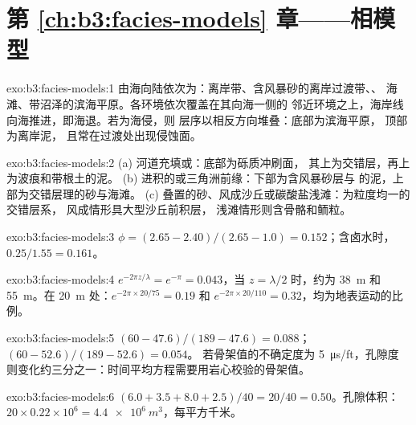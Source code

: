 \section*{第 \ref{ch:b3:facies-models} 章——相模型}

\begin{solution}{exo:b3:facies-models:1}
由海向陆依次为：离岸带、含风暴砂的离岸过渡带、、
海滩、带沼泽的滨海平原。各环境依次覆盖在其向海一侧的
邻近环境之上，海岸线向海推进，即海退。若为海侵，则
层序以相反方向堆叠：底部为滨海平原，
顶部为离岸泥，
且常在过渡处出现侵蚀面。
\end{solution}

\begin{solution}{exo:b3:facies-models:2}
(a) 河道充填或：底部为砾质冲刷面，
其上为交错层，再上为波痕和带根土的泥。
(b) 进积的或三角洲前缘：下部为含风暴砂层与
的泥，上部为交错层理的砂与海滩。
(c) 叠置的砂、风成沙丘或碳酸盐浅滩：为粒度均一的交错层系，
风成情形具大型沙丘前积层，
浅滩情形则含骨骼和鲕粒。
\end{solution}

\begin{solution}{exo:b3:facies-models:3}
$\phi = (2.65 - 2.40)/(2.65 - 1.0) = 0.152$；含卤水时，
$0.25/1.55 = 0.161$。
\end{solution}

\begin{solution}{exo:b3:facies-models:4}
$e^{-2\pi z/\lambda} = e^{-\pi} = 0.043$，当 $z = \lambda/2$ 时，约为
\qty{38}{m} 和 \qty{55}{m}。在 \qty{20}{m} 处：$e^{-2\pi\times20/75} = 0.19$
和 $e^{-2\pi\times20/110} = 0.32$，均为地表运动的比例。
\end{solution}

\begin{solution}{exo:b3:facies-models:5}
$(60 - 47.6)/(189 - 47.6) = 0.088$；$(60 - 52.6)/(189 - 52.6) = 0.054$。
若骨架值的不确定度为 \qty{5}{\micro\second/ft}，孔隙度
则变化约三分之一：时间平均方程需要用岩心校验的骨架值。
\end{solution}

\begin{solution}{exo:b3:facies-models:6}
$(6.0 + 3.5 + 8.0 + 2.5)/40 = 20/40 = 0.50$。孔隙体积：$20\times0.22
\times10^6 = \qty{4.4e6}{m^3}$，每平方千米。
\end{solution}

